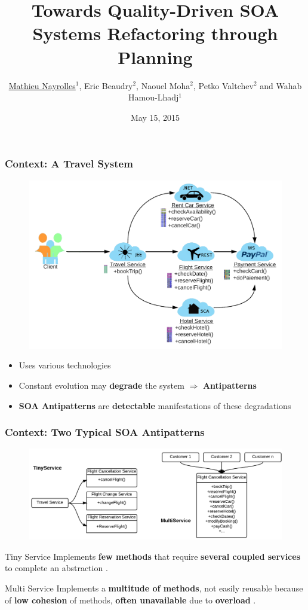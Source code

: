 \documentclass{beamer}
\title[SOMAD-R]{Towards Quality-Driven SOA Systems
Refactoring through Planning} %
\author[Mathieu Nayrolles]{\underline{Mathieu Nayrolles$^1$}, Eric Beaudry$^2$, Naouel Moha$^2$, Petko Valtchev$^2$ and Wahab Hamou-Lhadj$^1$} %
\institute[Concordia] %
{
$^1$Software Behaviour Analysis (SBA) Research Lab, ECE,  Concordia, Montr\'eal, Canada\\
$^2$Latece Research Lab, D\'epartement d'informatique, Universit\'e du Qu\'ebec Montr\'eal, Canada \\ 
\medskip
\textit{mathieu.nayrolles@gmail.com, \{eric.beaudy,naouel.moha,petko.valtchev\}@uqam.ca,  wahab.hamou-lhadj@concordia.ca} %
}
\date{May 15, 2015} %
\begin{document}
\begin{frame}
\titlepage %
\end{frame}


\begin{frame}
\frametitle{Context: A Travel System}
\vspace{-0.5cm}
\begin{figure}
\includegraphics[width=0.8\linewidth]{media/context.png}
\end{figure}

\begin{itemize}
\vspace{-1cm}
\item Uses various technologies
\item Constant evolution may \textbf{degrade} the system $\Rightarrow$ \textbf{Antipatterns}
\item \textbf{SOA Antipatterns} are \textbf{detectable} manifestations
of these degradations \cite{p1}
\end{itemize}
\end{frame}

\begin{frame}
\vspace{-0.2cm}
\frametitle{Context: Two Typical SOA Antipatterns}
\begin{figure}
\includegraphics[width=0.8\linewidth]{media/AP.png}
\end{figure}
\vspace{-0.3cm}
\begin{block}{Tiny Service}
Implements \textbf{few methods} that require \textbf{several coupled services} to complete an abstraction \cite{p2}.
\end{block}

\begin{block}{Multi Service}
Implements a \textbf{multitude of methods}, not easily reusable because of \textbf{low cohesion} of methods,  \textbf{often unavailable} due to \textbf{overload} \cite{p2}.
\end{block}

\end{frame}
\end{document}
